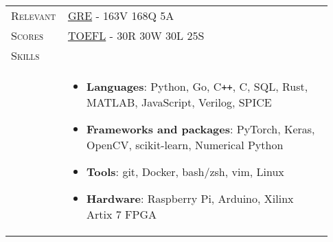\documentclass[letterpaper, 10pt, oneside]{article}
\newcommand{\stitle}[1]{\normalsize{\textsc{#1}}}
\newcommand{\bdit}[1]{{\textbf{#1}}}
\begin{document}
\begin{longtable}{@{} p{0.13\linewidth} p{0.8\linewidth}}
    \stitle{Relevant}    & \href{https://drive.google.com/file/d/1GcdXmPTWR-6tKUgB92V8pG8GVn-ng_6C}{GRE} \hspace{3mm} - 163V 168Q 5A                                                                                                                     \\[0.3ex]
    \stitle{Scores}      & \href{https://drive.google.com/file/d/1lHDbt59e9o1LFKb_HhWiVbzITH7avB6j}{TOEFL} - 30R 30W 30L 25S                                                                                                                             \\

    \newpage
    \stitle{Skills}      &                                                                                                                                                                                                                               \\[-2.34ex]
                         & \parbox{0.8\textwidth}{                                                                                                                                                                                                       %
        \begin{itemize}[leftmargin=0ex, itemsep=-0.4ex, topsep=-2ex, label={}]
            \item \bdit{Languages}:               Python, Go, C\texttt{++}, C, SQL, Rust, MATLAB, JavaScript, Verilog, SPICE
            \item \bdit{Frameworks and packages}: PyTorch, Keras, OpenCV, scikit-learn, Numerical Python
            \item \bdit{Tools}:                   git, Docker, bash/zsh, vim, Linux
            \item \bdit{Hardware}:                Raspberry Pi, Arduino, Xilinx Artix 7 FPGA
        \end{itemize}
    }
    \\
    \\[1ex]



\end{longtable}
\end{document}
